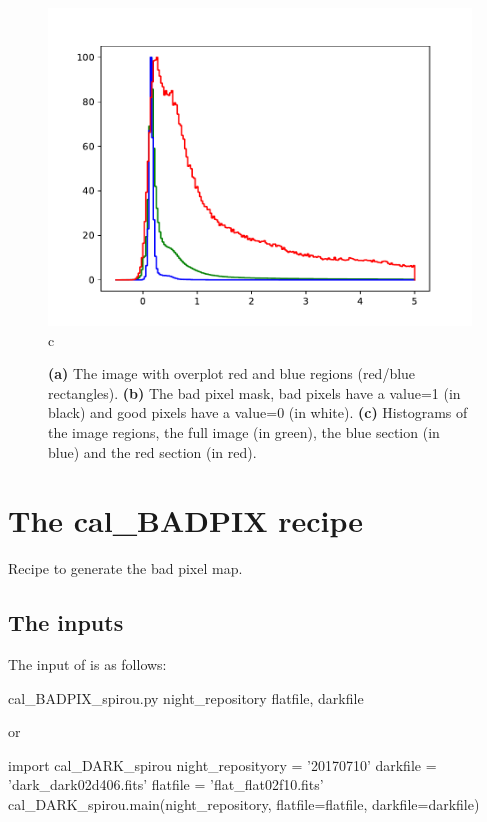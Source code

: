 \begin{figure}
\begin{center}
\begin{minipage}{.495\textwidth}
\begin{center}
\includegraphics[width=\textwidth]{Figures/cal_DARK_spirou_3.pdf}
c
\end{center}
\end{minipage}%
\end{center}

\caption{\textbf{(a)} The image with overplot red and blue regions (red/blue rectangles). \textbf{(b)} The bad pixel mask, bad pixels have a value=1 (in black) and good pixels have a value=0 (in white). \textbf{(c)} Histograms of the image regions, the full image (in green), the blue section (in blue) and the red section (in red). \label{figure:cal_DARK_spirou}}
\end{figure}



\clearpage
\newpage
\section{The cal\_BADPIX recipe}
\label{ch:the_recipes:cal_BADPIX_spirou}

Recipe to generate the bad pixel map. \\

\subsection{The inputs}
The input of \calbadpix is as follows:
\begin{cmdbox}
cal_BADPIX_spirou.py  night_repository  flatfile, darkfile
\end{cmdbox}
\noindent or
\begin{pythonbox}
import cal_DARK_spirou
night_reposityory = '20170710'
darkfile = 'dark_dark02d406.fits'
flatfile = 'flat_flat02f10.fits'
cal_DARK_spirou.main(night_repository, flatfile=flatfile, darkfile=darkfile)
\end{pythonbox}

